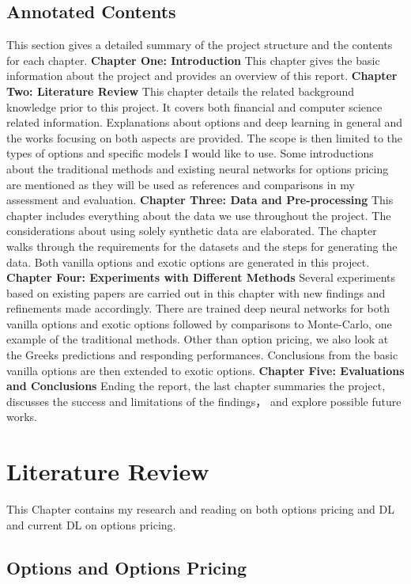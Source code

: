 \documentclass{report}
\begin{document}
\section{Annotated Contents}
This section gives a detailed summary of the project structure and the contents for each chapter.
\textbf{Chapter One: Introduction}
This chapter gives the basic information about the project and provides an overview of this report.
\textbf{Chapter Two: Literature Review}
This chapter details the related background knowledge prior to this project. It covers both financial and computer science related information. Explanations about options and deep learning in general and the works focusing on both aspects are provided. The scope is then limited to the types of options and specific models I would like to use. Some introductions about the traditional methods and existing neural networks for options pricing are mentioned as they will be used as references and comparisons in my assessment and evaluation.
\textbf{Chapter Three: Data and Pre-processing}
This chapter includes everything about the data we use throughout the project. The considerations about using solely synthetic data are elaborated. The chapter walks through the requirements for the datasets and the steps for generating the data. Both vanilla options and exotic options are generated in this project.
\textbf{Chapter Four: Experiments with Different Methods}
Several experiments based on existing papers are carried out in this chapter with new findings and refinements made accordingly. There are trained deep neural networks for both vanilla options and exotic options followed by comparisons to Monte-Carlo, one example of the traditional methods. Other than option pricing, we also look at the Greeks predictions and responding performances. Conclusions from the basic vanilla options are then extended to exotic options.
\textbf{Chapter Five: Evaluations and Conclusions}
Ending the report, the last chapter summaries the project, discusses the success and limitations of the findings， and explore possible future works.

\chapter{Literature Review}

This Chapter contains my research and reading on both options pricing and DL and current DL on options pricing.

\section{Options and Options Pricing}
\end{document}
